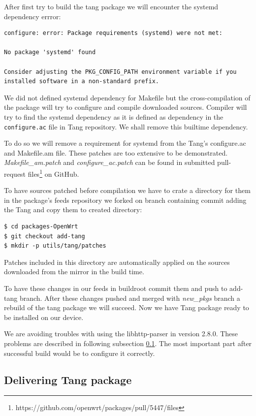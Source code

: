 After first try to build the tang package we will encounter the systemd dependency errror:
\begin{lstlisting}[columns=fixed,basicstyle=\ttfamily\footnotesize,tabsize=4,backgroundcolor=\color{yellow!10}]
configure: error: Package requirements (systemd) were not met:

No package 'systemd' found

Consider adjusting the PKG_CONFIG_PATH environment variable if you
installed software in a non-standard prefix.
\end{lstlisting}
We did not defined systemd dependency for Makefile but the cross-compilation of the package will try to configure and compile downloaded sources.
Compiler will try to find the systemd dependency as it is defined as dependency in the {\tt configure.ac} file in Tang repository.
We shall remove this builtime dependency.

To do so we will remove a requirement for systemd from the Tang's configure.ac and Makefile.am file.
These patches are too extensive to be demonstrated.
{\it Makefile\_am.patch} and {\it configure\_ac.patch} can be found in submitted pull-request files\footnote{https://github.com/openwrt/packages/pull/5447/files} on GitHub.

To have sources patched before compilation we have to crate a directory for them in the package's feeds repository we forked on branch containing commit adding the Tang and copy them to created directory:
\begin{lstlisting}[columns=fixed,basicstyle=\ttfamily\footnotesize,tabsize=4,backgroundcolor=\color{yellow!10}]
$ cd packages-OpenWrt
$ git checkout add-tang
$ mkdir -p utils/tang/patches
\end{lstlisting}
Patches included in this directory are automatically applied on the sources downloaded from the mirror in the build time.

To have these changes in our feeds in buildroot commit them and push to add-tang branch.
After these changes pushed and merged with {\it new\_pkgs} branch a rebuild of the tang package we will succeed.
Now we have Tang package ready to be installed on our device.

We are avoiding troubles with using the libhttp-parser in version 2.8.0.
These problems are described in following subsection \ref{porting_problems}.
The most important part after successful build would be to configure it correctly.



\subsection{Delivering Tang package}\label{porting_problems}

